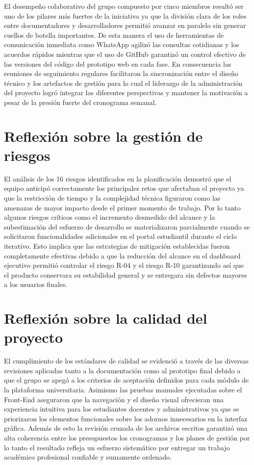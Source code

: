 \documentclass[11pt,spanish]{article}
\begin{document}
El desempeño colaborativo del grupo compuesto por cinco miembros resultó ser uno de los pilares más fuertes de la iniciativa ya que la división clara de los roles entre documentadores y desarrolladores permitió avanzar en paralelo sin generar cuellos de botella importantes. De esta manera el uso de herramientas de comunicación inmediata como WhatsApp agilizó las consultas cotidianas y los acuerdos rápidos mientras que el uso de GitHub garantizó un control efectivo de las versiones del código del prototipo web en cada fase. En consecuencia las reuniones de seguimiento regulares facilitaron la sincronización entre el diseño técnico y los artefactos de gestión para lo cual el liderazgo de la administración del proyecto logró integrar las diferentes perspectivas y mantener la motivación a pesar de la presión fuerte del cronograma semanal.

\section{Reflexión sobre la gestión de riesgos}

El análisis de los 16 riesgos identificados en la planificación demostró que el equipo anticipó correctamente los principales retos que afectaban el proyecto ya que la restricción de tiempo y la complejidad técnica figuraron como las amenazas de mayor impacto desde el primer momento de trabajo. Por lo tanto algunos riesgos críticos como el incremento desmedido del alcance y la subestimación del esfuerzo de desarrollo se materializaron parcialmente cuando se solicitaron funcionalidades adicionales en el portal estudiantil durante el ciclo iterativo. Esto implica que las estrategias de mitigación establecidas fueron completamente efectivas debido a que la reducción del alcance en el dashboard ejecutivo permitió controlar el riesgo R-04 y el riesgo R-10 garantizando así que el producto conservara su estabilidad general y se entregara sin defectos mayores a los usuarios finales.

\section{Reflexión sobre la calidad del proyecto}

El cumplimiento de los estándares de calidad se evidenció a través de las diversas revisiones aplicadas tanto a la documentación como al prototipo final debido a que el grupo se apegó a los criterios de aceptación definidos para cada módulo de la plataforma universitaria. Asimismo las pruebas manuales ejecutadas sobre el Front-End aseguraron que la navegación y el diseño visual ofrecieran una experiencia intuitiva para los estudiantes docentes y administrativos ya que se priorizaron los elementos funcionales sobre los adornos innecesarios en la interfaz gráfica. Además de esto la revisión cruzada de los archivos escritos garantizó una alta coherencia entre los presupuestos los cronogramas y los planes de gestión por lo tanto el resultado refleja un esfuerzo sistemático por entregar un trabajo académico profesional confiable y sumamente ordenado.
\end{document}
